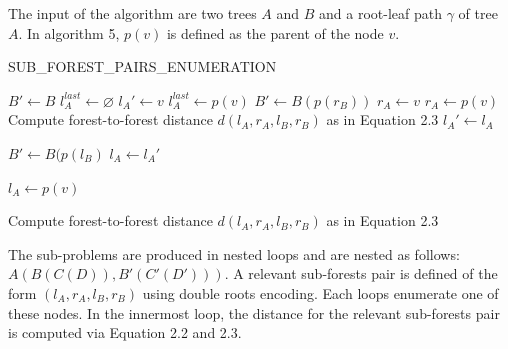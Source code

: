 The input of the algorithm are two trees $A$ and $B$ and a root-leaf path $\gamma$ of tree $A$. In algorithm 5, $p(v)$ is defined as the parent of the node $v$.
\IncMargin{1em}
\begin{algorithm}
  \caption{SUB\_FOREST\_PAIRS\_ENUMERATION}

  \Input{\TreeA , \TreeB , \RLP}
  
   { 
    $B' \gets B$\;
    $l_A^{last} \gets \varnothing$\;
    $l_A' \gets v$\;
  	 {
       { 
    	 {   
    	  $l_A^{last} \gets p(v)$\;
    	   {
		     $B' \gets B(p(r_B))$  				
    	  }
    	  $r_A \gets v$\; 		
    	  }
    	   {
    	      {
			   $r_A \gets p(v)$				
    		  }
    		  {
    			Compute forest-to-forest distance $d(l_A, r_A, l_B, r_B)$ as in Equation 2.3\;
    		  }
    		  $l_A' \gets l_A$\;
    		 }
    	  }	    	
    	}
      {
     	 {
     	   {
			 {
			  $B' \gets B(p(l_B)$		
			}
     	  }
     	  $l_A \gets l_A'$\;	
     	   {
			 {
				$l_A \gets p(v)$		
			}
			
			 {
				Compute forest-to-forest distance $d(l_A, r_A, l_B, r_B)$ as in Equation 2.3\;		
			}     	  
     	  }		     	
     	}
     }
    }
\end{algorithm}

The sub-problems are produced in nested loops and are nested as follows:$A(B(C(D)), B'(C'(D')))$. A relevant sub-forests pair is defined of the form $(l_A, r_A, l_B, r_B)$ using double roots encoding. Each loops enumerate one of these nodes. In the innermost loop, the distance for the relevant sub-forests pair is computed via Equation 2.2 and 2.3.

